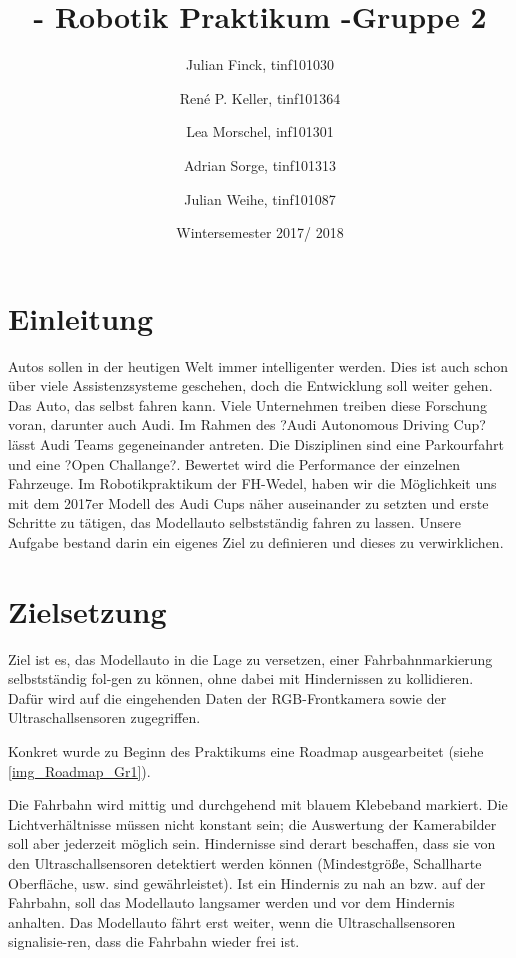 \documentclass[12pt,a4paper]{report}
\begin{document}

\title{- Robotik Praktikum -\endgraf Gruppe 2}
\author{
  Julian Finck, tinf101030 \and
  René P. Keller, tinf101364 \and
  Lea Morschel, inf101301 \and
  Adrian Sorge, tinf101313 \and
  Julian Weihe, tinf101087}
\date{Wintersemester 2017/ 2018}
\maketitle

\newpage
\tableofcontents %
\newpage




\chapter{Einleitung}

Autos sollen in der heutigen Welt immer intelligenter werden. Dies ist auch schon über viele Assistenzsysteme geschehen, 
doch die Entwicklung soll weiter gehen. Das Auto, das selbst fahren kann. Viele Unternehmen treiben diese Forschung voran, 
darunter auch Audi.
Im Rahmen des  ?Audi Autonomous Driving Cup? lässt Audi Teams gegeneinander antreten. Die Disziplinen sind eine Parkourfahrt 
und eine ?Open Challange?. Bewertet wird die Performance der einzelnen Fahrzeuge.
Im Robotikpraktikum der FH-Wedel, haben wir die Möglichkeit uns mit dem 2017er Modell des Audi Cups näher auseinander zu setzten 
und erste Schritte zu tätigen, das Modellauto selbstständig fahren zu lassen.
Unsere Aufgabe bestand darin ein eigenes Ziel zu definieren und dieses zu verwirklichen.


\chapter{Zielsetzung}

Ziel ist es, das Modellauto in die Lage zu versetzen, einer Fahrbahnmarkierung selbstständig fol-gen zu können, ohne dabei 
mit Hindernissen zu kollidieren. Dafür wird auf die eingehenden Daten der RGB-Frontkamera sowie der Ultraschallsensoren 
zugegriffen.

Konkret wurde zu Beginn des Praktikums eine Roadmap ausgearbeitet (siehe \autoref{img_Roadmap_Gr1}).

Die Fahrbahn wird mittig und durchgehend mit blauem Klebeband markiert. Die Lichtverhältnisse  müssen nicht konstant sein; 
die Auswertung der Kamerabilder soll aber jederzeit möglich sein. Hindernisse sind derart beschaffen, dass sie von den 
Ultraschallsensoren detektiert werden können (Mindestgröße, Schallharte Oberfläche, usw. sind gewährleistet).
Ist ein Hindernis zu nah an bzw. auf der Fahrbahn, soll das Modellauto langsamer werden und vor dem Hindernis anhalten. 
Das Modellauto fährt erst weiter, wenn die Ultraschallsensoren signalisie-ren, dass die Fahrbahn wieder frei ist.
\end{document}
